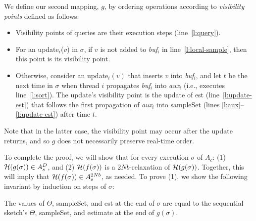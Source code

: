 We define our second mapping, $g$, 
by ordering operations according to  \emph{visibility points} defined as follows: 
\begin{itemize}
\item
Visibility points of queries are their execution steps    (line~\ref{l:query}). 
\item
For an update$_i$($v$) in $\sigma$, 
if $v$ is not added to \emph{buf$_i$} in line~\ref{l:local-sample}, then this point is its visibility point. 
\item
Otherwise, consider an update$_i(v)$ that inserts $v$ into \emph{buf$_i$}, and  
let $t$ be the next time in $\sigma$ when thread $i$ propagates \emph{buf$_i$} into \emph{aux$_i$}
(i.e., executes line~\ref{l:sort}). The update's visibility point is 
the update of est (line~\ref{l:update-est}) that follows
the first propagation of \emph{aux}$_i$ into sampleSet (lines \ref{l:aux}--\ref{l:update-est})
after time $t$. 
\end{itemize}
 Note that in the latter case, 
the visibility point may occur after the update returns, and so $g$ does not 
necessarily preserve real-time order.

To complete the proof, we will show that for every execution $\sigma$ of $A_c$:
(1) ${\cal H}(g(\sigma)) \in A^D_s$, and 
(2)  ${\cal H}(f(\sigma))$ is a $2Nb$-relaxation of ${\cal H}(g(\sigma))$.  
Together, this will imply that ${\cal H}(f(\sigma)) \in A^{2Nb}_s$, as needed.  
%
To prove (1), we show the following invariant by induction on steps of  $\sigma$:

 \begin{invariant} 
 The values of $\Theta$, sampleSet, and est at the end of $\sigma$ are equal to the sequential sketch's 
  $\Theta$, sampleSet, and estimate at the end of $g(\sigma)$. 
  \label{inv:theta-est}
 \end{invariant} 

